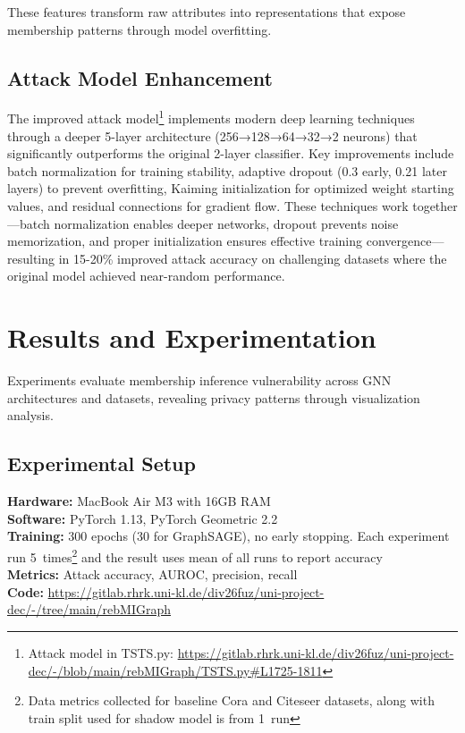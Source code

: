 \documentclass{article}
\begin{document}
These features transform raw attributes into representations that expose membership patterns through model overfitting.

\subsection{Attack Model Enhancement}
The improved attack model\footnote{Attack model in TSTS.py: \url{https://gitlab.rhrk.uni-kl.de/div26fuz/uni-project-dec/-/blob/main/rebMIGraph/TSTS.py\#L1725-1811}} implements modern deep learning techniques \cite{he2015delving} through a deeper 5-layer architecture (256→128→64→32→2 neurons) that significantly outperforms the original 2-layer classifier. Key improvements include batch normalization for training stability, adaptive dropout (0.3 early, 0.21 later layers) to prevent overfitting, Kaiming initialization for optimized weight starting values, and residual connections for gradient flow. These techniques work together—batch normalization enables deeper networks, dropout prevents noise memorization, and proper initialization ensures effective training convergence—resulting in 15-20\% improved attack accuracy on challenging datasets where the original model achieved near-random performance.

\section{Results and Experimentation}
\label{results}
Experiments evaluate membership inference vulnerability across GNN architectures and datasets, revealing privacy patterns through visualization analysis.

\subsection{Experimental Setup}
\textbf{Hardware:} MacBook Air M3 with 16GB RAM\\
\textbf{Software:} PyTorch 1.13, PyTorch Geometric 2.2\\
\textbf{Training:} 300 epochs (30 for GraphSAGE), no early stopping. Each experiment run 5~times\footnote{Data metrics collected for baseline Cora and Citeseer datasets, along with train split used for shadow model is from 1~run} and the result uses mean of all runs to report accuracy\\
\textbf{Metrics:} Attack accuracy, AUROC, precision, recall\\
\textbf{Code:} \url{https://gitlab.rhrk.uni-kl.de/div26fuz/uni-project-dec/-/tree/main/rebMIGraph}
\end{document}
